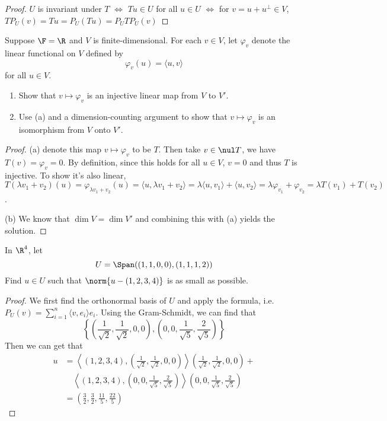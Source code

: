 \documentclass{extarticle}
\begin{document}
\begin{proof}
\(U\) is invariant under \(T\) \(\Longleftrightarrow\) \(Tu \in U\) for all \(u \in U\) 
\(\Longleftrightarrow\) for \(v = u + u^\perp \in V\), \(TP_U (v) = Tu = P_U(Tu) = P_U T P_U (v) \)
\end{proof}

\begin{problem}{13}
    Suppose \(\F = \R\) and \(V\) is finite-dimensional. For each \(v \in V\), let \(\varphi_v\) denote 
    the linear functional on \(V\) defined by 
    \[\varphi_v(u) = \langle u,v \rangle\]
    for all \(u \in V\).
    \begin{enumerate}[label=(\alph*)]
        \item Show that \(v \mapsto \varphi_v\) is an injective linear map from \(V\) to \(V'\). 
        \item Use (a) and a dimension-counting argument to show that \(v \mapsto \varphi_v\) is an 
        isomorphism from \(V\) onto \(V'\).
    \end{enumerate}
\end{problem}

\begin{proof}
(a) denote this map \(v \mapsto \varphi_v\) to be \(T\). Then take \(v \in \nul T\), we have 
\(T(v) = \varphi_v = 0\). By definition, since this holds for all \(u \in V\), \(v = 0\) and thus 
\(T\) is injective. To show it's also linear, \(T (\lambda v_1 + v_2) (u)
= \varphi_{\lambda v_1 + v_2} (u) = \langle u, \lambda v_1 + v_2 \rangle = \lambda \langle u,v_1 \rangle 
+ \langle u,v_2 \rangle = \lambda \varphi_{v_1} + \varphi_{v_2} = \lambda T(v_1) + T(v_2) \). 

(b) We know that \(\dim V = \dim V'\) and combining this with (a) yields the solution.
\end{proof}

\begin{problem}{15}
    In \(\R^4\), let 
    \[U = \Span((1,1,0,0),(1,1,1,2))\]
    Find \(u \in U\) such that \(\norm{u - (1,2,3,4)}\) is as small as possible.
\end{problem}

\begin{proof}
We first find the orthonormal basis of \(U\) and apply the formula, i.e. \(P_U(v) = \sum_{i=1}^{n} 
\langle v,e_i \rangle e_i\). Using the Gram-Schmidt, we can find that 
\[\left\{\left(\frac{1}{\sqrt{2}}, \frac{1}{\sqrt{2}}, 0, 0 \right), \left(0, 0, \frac{1}{\sqrt{5}}, \frac{2}{\sqrt{5}}\right)\right\}\]
Then we can get that 
\begin{align*}
    u &= \left\langle (1,2,3,4),\left(\frac{1}{\sqrt{2}}, \frac{1}{\sqrt{2}}, 0, 0\right) \right\rangle 
\left(\frac{1}{\sqrt{2}}, \frac{1}{\sqrt{2}}, 0, 0 \right) +  \\ 
&\quad \left\langle (1,2,3,4),\left(0, 0, \frac{1}{\sqrt{5}}, \frac{2}{\sqrt{5}}\right) \right\rangle 
\left(0, 0, \frac{1}{\sqrt{5}}, \frac{2}{\sqrt{5}}\right) \\ 
&= \left(\frac{3}{2}, \frac{3}{2}, \frac{11}{5}, \frac{22}{5}\right)
\end{align*}
\end{proof}
\end{document}

